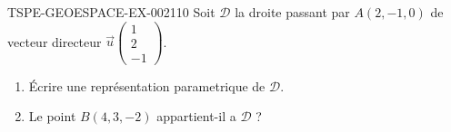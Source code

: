 \begin{exercice}{TSPE-GEOESPACE-EX-002}{1}{10}
Soit $\mathcal{D}$ la droite passant par $A(2,-1,0)$ de vecteur directeur $\vec{u}\begin{pmatrix}1\\2\\-1\end{pmatrix}$.
\begin{enumerate}
  \item Écrire une représentation parametrique de $\mathcal{D}$.
  \item Le point $B(4,3,-2)$ appartient-il a $\mathcal{D}$ ?
\end{enumerate}
\end{exercice}
